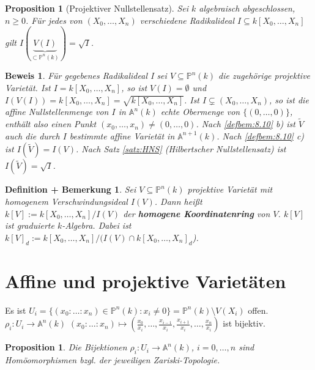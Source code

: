 \documentclass[a4paper,12pt]{report}
\theoremstyle{break}
\newtheorem{DefBem}[Def]{Definition + Bemerkung}
\newtheorem{Prop}[Def]{Proposition}
\theoremstyle{nonumberbreak}
\theoremstyle{nonumberplain}
\newtheorem{Bew}{Beweis}
\newcommand{\emp}[1]{\textbf{\emph{#1}}}
\newcommand{\begriff}[1]{{\index{#1}}\emp{#1}}
\begin{document}
\begin{Prop}[Projektiver Nullstellensatz]
\label{prop:8.9}
 Sei $k$ algebraisch abgeschlossen, $n \ge 0$. Für jedes von $(X_0, \dots, X_n)$ verschiedene Radikalideal $I \subseteq k[X_0,\dots,X_n]$ gilt $I(\underbrace{V(I)}_{\subset \mathbb P^n(k)})=\sqrt{I}$.
\end{Prop}
\begin{Bew}
Für gegebenes Radikalideal I sei $V \subseteq \mathbb P^n(k)$ die zugehörige projektive Varietät. Ist $I = k[X_0, \dots, X_n]$, so ist $V(I) = \emptyset$ und $I(V(I))=k[X_0, \dots, X_n] = \sqrt{k[X_0, \dots, X_n]}$. Ist $I \subsetneq (X_0, \dots, X_n)$, so ist die affine Nullstellenmenge von $I$ in $\mathbb A^n(k)$ echte Obermenge von $\{(0,\dots, 0)\}$, enthält also einen Punkt $(x_0, \dots, x_n) \ne (0, \dots, 0)$.
Nach \ref{defbem:8.10} b) ist $\tilde{V}$ auch die durch $I$ bestimmte affine Varietät in $\mathbb A^{n+1}(k)$. Nach \ref{defbem:8.10} c) ist $I(\tilde{V})=I(V)$. Nach Satz \ref{satz:HNS} (Hilbertscher Nullstellensatz) ist $I(\tilde{V})=\sqrt{I}$.  
\end{Bew}
\begin{DefBem}
 \label{defbem:8.11}
Sei $V \subseteq \mathbb P^n(k)$ projektive Varietät mit homogenem Verschwindungsideal $I(V)$. Dann heißt $k[V]:=k[X_0, \dots, X_n]/I(V)$ der \begriff{homogene Koordinatenring} von $V$. $k[V]$ ist graduierte $k$-Algebra. Dabei ist $k[V]_d:=k[X_0, \dots, X_n]/(I(V) \cap k[X_0, \dots, X_n]_d$).
\end{DefBem}

\section{Affine und projektive Varietäten}
Es ist $U_i =\{(x_0: \dots: x_n)\in \mathbb P^n(k):x_i \ne 0\}=\mathbb P^n(k) \setminus V(X_i)$ offen.
$\rho_i:U_i \rightarrow \mathbb A^n(k)$ $(x_0: \dots: x_n) \mapsto (\frac{x_0}{x_i}, \dots , \frac{x_{i-1}}{x_i},\frac{x_{i+1}}{x_i}, \dots , \frac{x_n}{x_i})$ ist bijektiv.
\begin{Prop}
 \label{prop:9.1}
 Die Bijektionen $\rho_i:U_i \rightarrow \mathbb A^n(k)$, $i = 0, \dots, n$ sind Homöomorphismen bzgl. der jeweiligen Zariski-Topologie.
\end{Prop}


\end{document}

